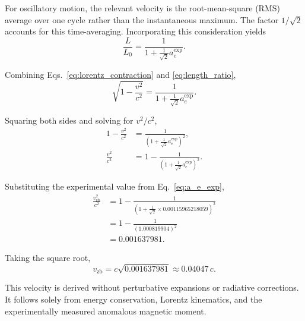 \documentclass[%
 reprint,
 amsmath,amssymb,
 aps,
 prb,
]{revtex4-2}
\numberwithin{equation}{section}
\begin{document}
For oscillatory motion, the relevant velocity is the root-mean-square (RMS) average over one cycle rather than the instantaneous maximum. The factor $1/\sqrt{2}$ accounts for this time-averaging. Incorporating this consideration yields
\begin{equation}
\frac{L}{L_0} = \frac{1}{1 + \frac{1}{\sqrt{2}} a_e^{\mathrm{exp}}}.
\label{eq:length_ratio}
\end{equation}

Combining Eqs.~\eqref{eq:lorentz_contraction} and \eqref{eq:length_ratio},
\begin{equation}
\sqrt{1 - \frac{v^2}{c^2}} = \frac{1}{1 + \frac{1}{\sqrt{2}} a_e^{\mathrm{exp}}}.
\label{eq:combined_relation}
\end{equation}

Squaring both sides and solving for $v^2/c^2$,
\begin{equation}
\begin{aligned}
1 - \frac{v^2}{c^2} &= \frac{1}{\left(1 + \frac{1}{\sqrt{2}} a_e^{\mathrm{exp}}\right)^2}, \\
\frac{v^2}{c^2} &= 1 - \frac{1}{\left(1 + \frac{1}{\sqrt{2}} a_e^{\mathrm{exp}}\right)^2}.
\end{aligned}
\label{eq:velocity_squared}
\end{equation}

Substituting the experimental value from Eq.~\eqref{eq:a_e_exp},
\begin{equation}
\begin{aligned}
\frac{v_{\mathrm{zb}}^2}{c^2} &= 1 - \frac{1}{(1 + \frac{1}{\sqrt{2}} \times 0.001159652 18059)^2} \\
&= 1 - \frac{1}{(1.000819904)^2} \\
&= 0.001637981.
\end{aligned}
\label{eq:v_zb_squared_numerical}
\end{equation}

Taking the square root,
\begin{equation}
v_{\mathrm{zb}} = c \sqrt{0.001637981} \approx 0.04047\,c.
\label{eq:v_zb_result}
\end{equation}

This velocity is derived without perturbative expansions or radiative corrections. It follows solely from energy conservation, Lorentz kinematics, and the experimentally measured anomalous magnetic moment.


\end{document}
